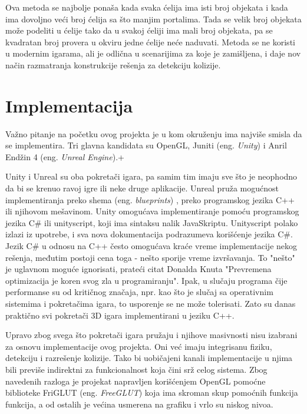 \documentclass[12pt,oneside]{memoir}
\begin{document}
Ova metoda se najbolje ponaša kada svaka ćelija ima isti broj objekata i kada ima dovoljno 
veći broj ćelija sa što manjim portalima.
Tada se velik broj objekata može podeliti u ćelije tako da u svakoj ćeliji ima mali broj objekata,
pa se kvadratan broj provera u okviru jedne ćelije neće naduvati.
Metoda se ne koristi u modernim igarama, ali je odlična u scenarijima za
koje je zamišljena, i daje nov način razmatranja konstrukcije rešenja za detekciju kolizije.

\chapter{Implementacija}
\label{sec:implementacija}

Važno pitanje na početku ovog projekta je u kom okruženju ima najviše smisla da se implementira.
Tri glavna kandidata su OpenGL, Juniti (eng. {\em Unity}) i Anril Endžin 4 (eng. {\em Unreal Engine}).+

Unity i Unreal su oba pokretači igara, pa samim tim imaju sve što je neophodno da 
bi se krenuo ravoj igre ili neke druge aplikacije.
Unreal pruža mogućnost implementiranja preko shema (eng. {\em blueprints})
, preko programskog jezika C++ ili njihovom mešavinom.
Unity omogućava implementiranje pomoću programskog jezika C\# ili unityscript,
koji ima sintaksu nalik JavaSkriptu. Unityscript polako izlazi iz upotrebe, i 
sva nova dokumentacija podrazumeva korišćenje jezika C\#.
Jezik C\# u odnosu na C++ često omogućava kraće vreme implementacije nekog rešenja,
međutim postoji cena toga - nešto sporije vreme izvršavanja.
To "nešto" je uglavnom moguće ignorisati, prateći citat Donalda Knuta 
"Prevremena optimizacija je koren svog zla u programiranju".
Ipak, u slučaju programa čije performanse su od kritičnog značaja, npr. kao što je 
slučaj sa operativnim sistemima i pokretačima igara, to usporenje se ne može tolerisati.
Zato su danas praktično svi pokretači 3D igara implementirani u jeziku C++.

Upravo zbog svega što pokretači igara pružaju i njihove masivnosti nisu izabrani
za osnovu implementacije ovog projekta. Oni već imaju integrisanu fiziku, detekciju 
i razrešenje kolizije. Tako bi uobičajeni kanali implementacije u njima 
bili previše indirektni za funkcionalnost koja čini srž celog sistema.
Zbog navedenih razloga je projekat napravljen korišćenjem OpenGL pomoćne 
biblioteke FriGLUT (eng. {\em FreeGLUT}) koja ima skroman skup pomoćnih funkcija
funkcija, a od ostalih je većina usmerena na grafiku i vrlo su niskog nivoa.
\end{document}
